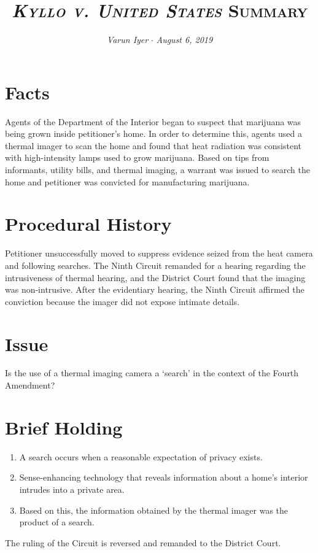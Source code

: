\documentclass[paper=letter,fontsize=10pt]{article}
\title{\textsc{\textit{Kyllo v. United States} Summary}}
\date{}
\author{\textit{Varun Iyer} \hspace{.5em} $\cdot$ \hspace{.5em} \textit{August 6, 2019}}
\begin{document}
\maketitle
\section{Facts}
	Agents of the Department of the Interior began to suspect that marijuana was being grown inside petitioner’s home. In order to determine this, agents used a thermal imager to scan the home and found that heat radiation was consistent with high-intensity lamps used to grow marijuana. 
	Based on tips from informants, utility bills, and thermal imaging, a warrant was issued to search the home and petitioner was convicted for manufacturing marijuana.
\section{Procedural History}
	Petitioner unsuccessfully moved to suppress evidence seized from the heat camera and following searches. 
	The Ninth Circuit remanded for a hearing regarding the intrusiveness of thermal hearing, and the District Court found that the imaging was non-intrusive.
	After the evidentiary hearing, the Ninth Circuit affirmed the conviction because the imager did not expose intimate details.
\section{Issue}
	Is the use of a thermal imaging camera a ‘search’ in the context of the Fourth Amendment?
\section{Brief Holding}
	\begin{enumerate}
		\item A search occurs when a reasonable expectation of privacy exists.
		\item Sense-enhancing technology that reveals information about a home’s interior intrudes into a private area.
		\item Based on this, the information obtained by the thermal imager was the product of a search.
	\end{enumerate}
	The ruling of the Circuit is reversed and remanded to the District Court.
\end{document}

